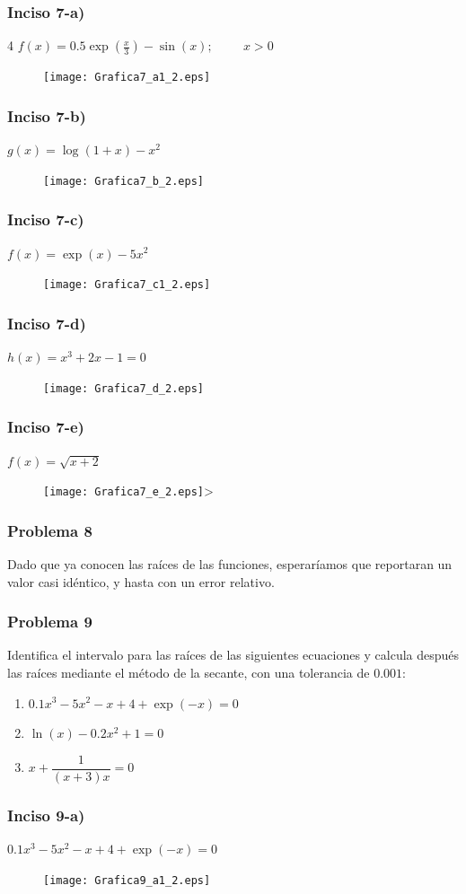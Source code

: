 \begin{frame}
\frametitle{Inciso 7-a)}4
$f(x) = 0.5\exp(\frac{x}{3})- \sin(x); \hspace{1cm} x > 0$
\begin{figure}
	\centering
	\texttt{[image: Grafica7\_a1\_2.eps]}
\end{figure}
\end{frame}
\begin{frame}
\frametitle{Inciso 7-b)}
$g(x) = \log(1 + x) - x^{2}$
\begin{figure}
	\centering
	\texttt{[image: Grafica7\_b\_2.eps]}
\end{figure}
\end{frame}
\begin{frame}
\frametitle{Inciso 7-c)}
$f(x) = \exp(x) - 5x^{2}$
\begin{figure}
	\centering
	\texttt{[image: Grafica7\_c1\_2.eps]}
\end{figure}
\end{frame}
\begin{frame}
\frametitle{Inciso 7-d)}
$h(x) = x^{3} + 2x - 1 = 0$
\begin{figure}
	\centering
	\texttt{[image: Grafica7\_d\_2.eps]}
\end{figure}
\end{frame}
\begin{frame}
\frametitle{Inciso 7-e)}
$f(x) = \sqrt{x+2}$
\begin{figure}
	\centering
	\texttt{[image: Grafica7\_e\_2.eps]}>
\end{figure}
\end{frame}
\begin{frame}
\frametitle{Problema 8}
Dado que ya conocen las raíces de las funciones, esperaríamos que reportaran un valor casi idéntico, y hasta con un error relativo.
\end{frame}
\begin{frame}
\frametitle{Problema 9}
Identifica el intervalo para las raíces de las siguientes ecuaciones y calcula después las raíces mediante el método de la secante, con una tolerancia de $0.001$:
	\begin{enumerate}
		\item $0.1 x^{3} - 5 x^{2} - x + 4 + \exp(-x) = 0 $
		\item $\ln(x) -0.2 x^{2} + 1 = 0$
		\item $x + \dfrac{1}{(x+3)x}= 0$
	\end{enumerate}
\end{frame}
\begin{frame}
\frametitle{Inciso 9-a)}
$0.1 x^{3} - 5 x^{2} - x + 4 + \exp(-x) = 0 $
\begin{figure}
	\centering
	\texttt{[image: Grafica9\_a1\_2.eps]}
\end{figure}
\end{frame}

